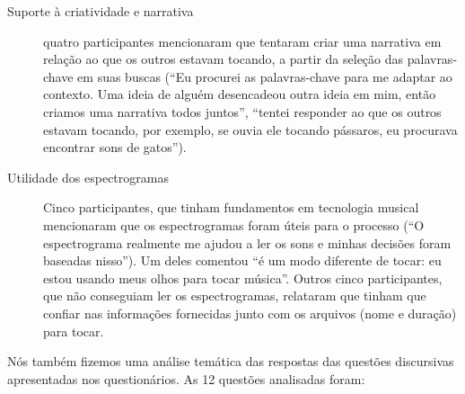 \begin{description}
\item[Suporte à criatividade e narrativa] quatro participantes mencionaram que tentaram criar uma narrativa em relação ao que os outros estavam tocando, a partir da seleção das palavras-chave em suas buscas (``Eu procurei as palavras-chave para me adaptar ao contexto. Uma ideia de alguém desencadeou outra ideia em mim, então criamos uma narrativa todos juntos'', ``tentei responder ao que os outros estavam tocando, por exemplo, se ouvia ele tocando pássaros, eu procurava encontrar sons de gatos'').

\item[Utilidade dos espectrogramas] Cinco participantes, que tinham fundamentos em tecnologia musical mencionaram que os espectrogramas foram úteis para o processo (``O espectrograma realmente me ajudou a ler os sons e minhas decisões foram baseadas nisso''). Um deles comentou ``é um modo diferente de tocar: eu estou usando meus olhos para tocar música''. Outros cinco participantes, que não conseguiam ler os espectrogramas, relataram que tinham que confiar nas informações fornecidas junto com os arquivos (nome e duração) para tocar.

\end{description}

Nós também fizemos uma análise temática das respostas das questões discursivas apresentadas nos questionários. As 12 questões analisadas foram: 

